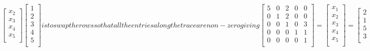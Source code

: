 \begin{enumerate}[label=(\alph*)]
\begin{subequations}
\begin{equation}
\begin{bmatrix}
                    x_{2}   \\
                    x_{3}   \\
                    x_{4}   \\
                    x_{5}   \\
                \end{bmatrix}
                \begin{bmatrix}
                    1       \\
                    2       \\
                    3       \\
                    4       \\
                    5       \\
                \end{bmatrix}
            \end{equation}
        is to swap the rows so that all the entries along the trace 
        are non-zero giving 
            \begin{equation}
                \begin{bmatrix}
                    5       &   0       &   2   &   0   &   0   \\
                    0       &   1       &   2   &   0   &   0   \\
                    0       &   0       &   1   &   0   &   3   \\
                    0       &   0       &   0   &   1   &   1   \\
                    0       &   0       &   0   &   0   &   1   \\
                \end{bmatrix}         =
                \begin{bmatrix}
                    x_{1}   \\
                    x_{2}   \\
                    x_{3}   \\
                    x_{4}   \\
                    x_{5}   \\
                \end{bmatrix}        =
                \begin{bmatrix}
                    2       \\
                    1       \\
                    5       \\
                    3       \\

\end{bmatrix}
\end{equation}
\end{subequations}
\end{enumerate}
